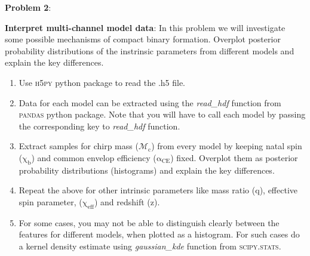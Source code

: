 \documentclass{article} %
\newcommand{\question}[2][]{\begin{flushleft}
        \textbf{Problem #1}: %
\end{flushleft}
}
\begin{document}
    \newpage
    
    \question[2]{} \textbf{Interpret multi-channel model data}: In this problem we will investigate some possible mechanisms of compact binary formation. Overplot posterior probability distributions of the instrinsic parameters from different models and explain the key differences.
    
    
    \begin{enumerate}
                \item Use \textsc{h5py} python package to read the .h5 file. 
                \item Data for each model can be extracted using the \textit{read\_hdf} function from {\textsc{pandas}} python package. Note that you will have to call each model by passing the corresponding key to \textit{read\_hdf} function.
                \item Extract samples for chirp mass ($\mathrm{\mathcal{M}_c}$) from every model by keeping  natal spin ($\mathrm{\chi_b}$) and common envelop efficiency ($\mathrm{\alpha_{CE}}$) fixed. Overplot them as posterior probability distributions (histograms) and explain the key differences. 
                \item Repeat the above for other intrinsic parameters like mass ratio ($\mathrm{q}$), effective spin parameter, ($\mathrm{\chi_{eff}}$) and redshift ($\mathrm{z}$).
                \item For some cases, you may not be able to distinguish clearly between the features for different models, when plotted as a histogram. For such cases do a kernel density estimate  using \textit{gaussian\_kde} function from {\textsc{scipy.stats}}.
            \end{enumerate}
    
    
    
        
        
 

 
\end{document}
